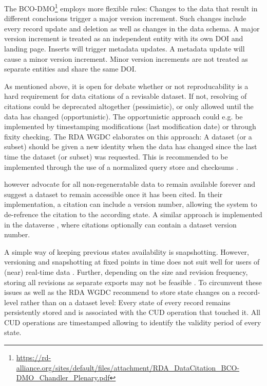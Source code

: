 \documentclass[a4paper,10pt]{article}
\begin{document}
The \gls{BCO-DMO}\footnote{\url{https://rd-alliance.org/sites/default/files/attachment/RDA_DataCitation_BCO-DMO_Chandler_Plenary.pdf}} employs more flexible rules: Changes to the data that result in different conclusions trigger a major version increment. 
Such changes include every record update and deletion as well as changes in the data schema.
A major version increment is treated as an independent entity with its own \gls{DOI} and landing page. Inserts will trigger metadata updates. A metadata update will cause a minor version increment. Minor version increments are not treated as separate entities and share the same \gls{DOI}.

As mentioned above, it is open for debate whether or not reproducability is a hard requirement for data citations of a revisable dataset. If not, resolving of citations could be deprecated altogether (pessimistic), or only allowed until the data has changed (opportunistic). The opportunistic approach could e.g. be implemented by timestamping modifications (last modification date) or through fixity checking. The \gls{RDA} \gls{WGDC} \citep{Rauber2015} elaborates on this approach: A dataset (or a subset) should be given a new identity when the data has changed since the last time the dataset (or subset) was requested. This is recommended to be implemented through the use of a normalized query store and checksums \citep{Ball2015}.

\cite{Gray2002} however advocate for all non-regeneratable data to remain available forever and  \cite{Buneman2010} suggest a dataset to remain accessible once it has been cited. In their implementation, a citation can include a version number, allowing the system to de-refrence the citation to the according state. A similar approach is implemented in the dataverse \citep{Crosas2011}, where citations optionally can contain a dataset version number. 

A simple way of keeping previous states availability is snapshotting. However, versioning and snapshotting at fixed points in time does not suit well for users of (near) real-time data  \citep{Huber2015}. Further, depending on the size and revision frequency, storing all revisions as separate exports may not be feasible \citep{Rauber2015}. To circumvent these issues \cite{AltKin07} as well as the \gls{RDA} \gls{WGDC} \citep{Rauber2015a, Rauber2015, Proll2013} recommend to store state changes on a record-level rather than on a dataset level: Every state of every record remains persistently stored and is associated with the \gls{CUD} operation that touched it. All \gls{CUD} operations are timestamped allowing to identify the validity period of every state.
\end{document}
